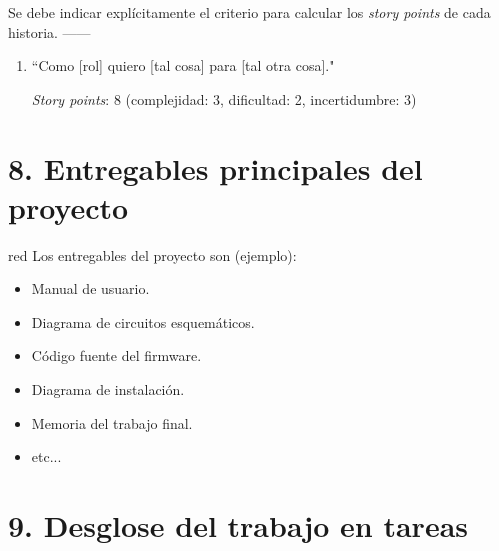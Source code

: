 \documentclass[
11pt, %
codirector, %
]{charter}
\begin{document}
Se debe indicar explícitamente el criterio para calcular los \textit{story points} de cada historia.
------


\begin{enumerate}
\item ``Como [rol] quiero [tal cosa] para [tal otra cosa]."

\textit{Story points}: 8 (complejidad: 3, dificultad: 2, incertidumbre: 3)
\end{enumerate}


\section{8. Entregables principales del proyecto}
\label{sec:entregables}

\begin{consigna}{red}
Los entregables del proyecto son (ejemplo):

\begin{itemize}
	\item Manual de usuario.
	\item Diagrama de circuitos esquemáticos.
	\item Código fuente del firmware.
	\item Diagrama de instalación.
	\item Memoria del trabajo final.
	\item etc...
\end{itemize}
\end{consigna}

\section{9. Desglose del trabajo en tareas}
\label{sec:wbs}
\end{document}
